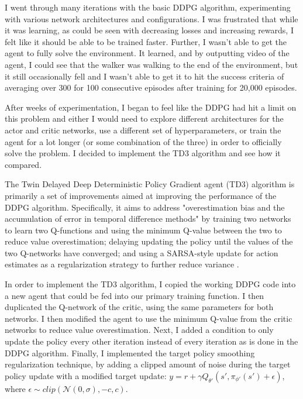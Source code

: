 \documentclass{article}
\begin{document}
I went through many iterations with the basic DDPG algorithm, experimenting with various network architectures and configurations. I was frustrated that while it was learning, as could be seen with decreasing losses and increasing rewards, I felt like it should be able to be trained faster. Further, I wasn't able to get the agent to fully solve the environment. It learned, and by outputting video of the agent, I could see that the walker was walking to the end of the environment, but it still occasionally fell and I wasn't able to get it to hit the success criteria of averaging over 300 for 100 consecutive episodes after training for 20,000 episodes.

After weeks of experimentation, I began to feel like the DDPG had hit a limit on this problem and either I would need to explore different architectures for the actor and critic networks, use a different set of hyperparameters, or train the agent for a lot longer (or some combination of the three) in order to officially solve the problem. I decided to implement the TD3 algorithm and see how it compared. 

The Twin Delayed Deep Deterministic Policy Gradient agent (TD3) algorithm is primarily a set of improvements aimed at improving the performance of the DDPG algorithm. Specifically, it aims to address "overestimation bias and the accumulation of error in temporal difference methods" by training two networks to learn two Q-functions and using the minimum Q-value between the two to reduce value overestimation; delaying updating the policy until the values of the two Q-networks have converged; and using a SARSA-style update for action estimates as a regularization strategy to further reduce variance \cite{DBLP:journals/corr/abs-1802-09477}. 

In order to implement the TD3 algorithm, I copied the working DDPG code into a new agent that could be fed into our primary training function. I then duplicated the Q-network of the critic, using the same parameters for both networks. I then modified the agent to use the minimum Q-value from the critic networks to reduce value overestimation. Next, I added a condition to only update the policy every other iteration instead of every iteration as is done in the DDPG algorithm. Finally, I implemented the target policy smoothing regularization technique, by adding a clipped amount of noise during the target policy update with a modified target update: $y=r+\gamma Q_{\theta'} (s', \pi_{\phi'}(s')+ \epsilon)$, where $\epsilon \sim clip(\mathcal{N}(0, \sigma), -c, c)$.
\end{document}
